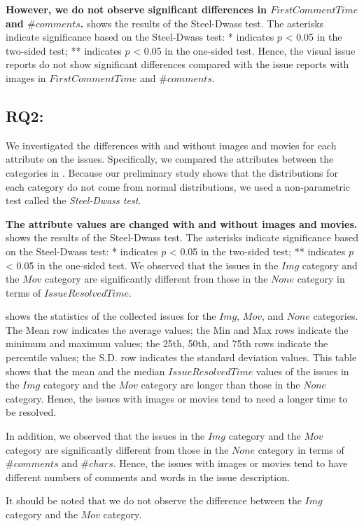 \textbf{However, we do not observe 
significant differences in $FirstCommentTime$ and $\#comments$.}
 shows the results of 
the Steel-Dwass test. 
The asterisks indicate significance based on 
the Steel-Dwass test: * indicates $p$ < 0.05 in 
the two-sided test; 
** indicates $p$ < 0.05 in the one-sided test. 
Hence, the visual issue reports do not show 
significant differences compared with 
the issue reports with images in 
$FirstCommentTime$ and $\#comments$.

\subsection{RQ2: \RQtwo{}}




We investigated 
the differences with and without images and movies 
for each attribute on the issues. 
Specifically, we compared the attributes between 
the categories in . 
Because our preliminary study shows that 
the distributions for each category do not 
come from normal distributions, 
we used a non-parametric test called the \textit{Steel-Dwass test}. 

\textbf{The attribute values are changed 
with and without images and movies.}
 shows the results of 
the Steel-Dwass test. 
The asterisks indicate significance based on 
the Steel-Dwass test: * indicates $p$ < 0.05 in 
the two-sided test; 
** indicates $p$ < 0.05 in the one-sided test. 
We observed that the issues in the $Img$ category and 
the $Mov$ category are significantly different from those 
in the $None$ category in terms of $IssueResolvedTime$. 


 shows the statistics
of the collected issues for the $Img$, $Mov$,
and $None$ categories.
The Mean row indicates the average values; 
the Min and Max rows indicate the minimum and maximum values; 
the 25th, 50th, and 75th rows indicate the percentile values; 
the S.D. row indicates the standard deviation values. 
This table shows that 
the mean and the median $IssueResolvedTime$ values of 
the issues in the $Img$ category and the $Mov$ category are 
longer than those in the $None$ category. 
Hence, the issues with images or movies tend to need 
a longer time to be resolved. 

In addition, we observed that the issues in 
the $Img$ category and the $Mov$ category are 
significantly different from those in 
the $None$ category in terms of $\#comments$ and 
$\#chars$. 
Hence, the issues with images or movies 
tend to have different numbers of 
comments and words in the issue description.

It should be noted that we do not observe 
the difference between the $Img$ category and 
the $Mov$ category. 


